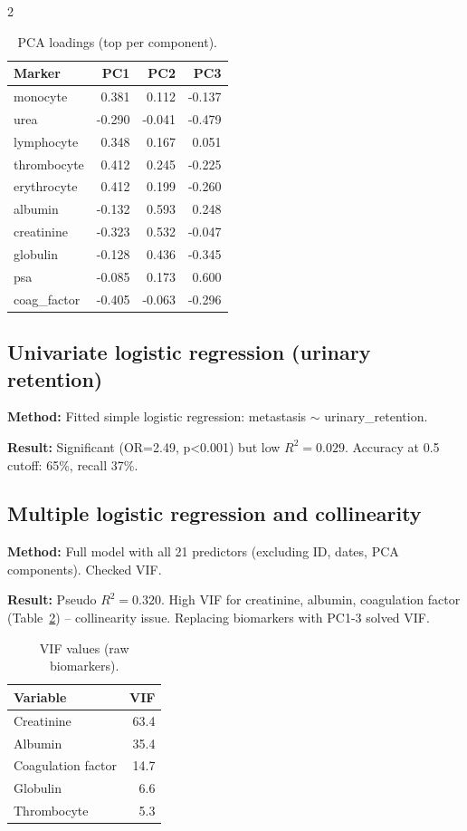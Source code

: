 ﻿\documentclass[a4paper,10pt]{article}
\begin{document}
\begin{multicols*}{2}
\begin{table}[H]
\centering
\caption{PCA loadings (top per component).}
\label{tab:loadings}
\begin{tabular}{lrrr}
\toprule
Marker & PC1 & PC2 & PC3 \\
\midrule
monocyte     & 0.381  & 0.112  & -0.137 \\
urea         & -0.290 & -0.041 & -0.479 \\
lymphocyte   & 0.348  & 0.167  & 0.051 \\
thrombocyte  & 0.412  & 0.245  & -0.225 \\
erythrocyte  & 0.412  & 0.199  & -0.260 \\
albumin      & -0.132 & 0.593  & 0.248 \\
creatinine   & -0.323 & 0.532  & -0.047 \\
globulin     & -0.128 & 0.436  & -0.345 \\
psa          & -0.085 & 0.173  & 0.600 \\
coag\_factor & -0.405 & -0.063 & -0.296 \\
\bottomrule
\end{tabular}
\end{table}

\subsection{Univariate logistic regression (urinary retention)}
\textbf{Method:} Fitted simple logistic regression: metastasis $\sim$ urinary\_retention.

\textbf{Result:} Significant (OR=2.49, p<0.001) but low $R^2=0.029$. Accuracy at 0.5 cutoff: 65\%, recall 37\%.

\subsection{Multiple logistic regression and collinearity}
\textbf{Method:} Full model with all 21 predictors (excluding ID, dates, PCA components). Checked VIF.

\textbf{Result:} Pseudo $R^2=0.320$. High VIF for creatinine, albumin, coagulation factor (Table~\ref{tab:vif}) – collinearity issue. Replacing biomarkers with PC1-3 solved VIF.

\begin{table}[H]
\centering
\caption{VIF values (raw biomarkers).}
\label{tab:vif}
\begin{tabular}{lr}
\toprule
Variable & VIF \\
\midrule
Creatinine & 63.4 \\
Albumin & 35.4 \\
Coagulation factor & 14.7 \\
Globulin & 6.6 \\
Thrombocyte & 5.3 \\
\bottomrule
\end{tabular}
\end{table}


\end{multicols*}
\end{document}
